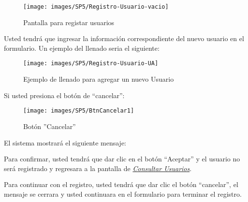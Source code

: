             \begin{figure}[!hbtp]
                \centering
                \hypertarget{registrarUs}{\texttt{[image: images/SP5/Registro-Usuario-vacio]}}
                \caption{Pantalla para registar usuarios}
                \label{registrarrh}
            \end{figure}
            
            Usted tendrá que ingresar la información correspondiente del nuevo usuario en el formulario. Un ejemplo del llenado seria el siguiente:
        
            \begin{figure}[!hbtp]
                \centering
                \hypertarget{ejreg}{\texttt{[image: images/SP5/Registro-Usuario-UA]}}
                \caption{Ejemplo de llenado para agregar un nuevo Usuario}
                \label{ejreg}
            \end{figure}
    
    \newpage
            Si usted presiona el botón de “cancelar”: 
            
            \begin{figure}[!hbtp]
                \centering
                \hypertarget{cancel1}{\texttt{[image: images/SP5/BtnCancelar1]}}
                \caption{Botón ''Cancelar''}
                \label{cancel1}
            \end{figure}
            
            El sistema mostrará el siguiente mensaje:

            
        
            Para confirmar, usted tendrá que dar clic en el botón “Aceptar” y el usuario no será registrado y regresara a la pantalla de \hyperlink{consultarUs}{\textit{Consultar Usuarios}}.
            
            Para continuar con el registro, usted tendrá que  dar clic el botón “cancelar”, el mensaje se cerrara y usted continuara en el formulario para terminar el registro.
            
